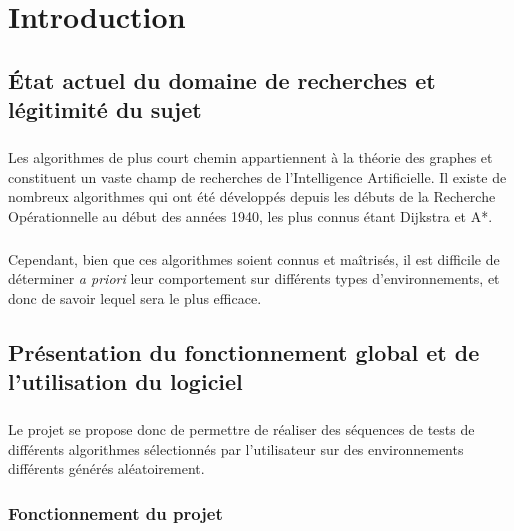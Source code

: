 \documentclass[pidr]{tnreport}
\begin{document}
\clearpage

\renewcommand{\baselinestretch}{0.5}\normalsize
\tableofcontents
\renewcommand{\baselinestretch}{1.0}\normalsize
\clearpage

\setcounter{page}{1}

\chapter{Introduction}

	\section{État actuel du domaine de recherches et légitimité du sujet}

\paragraph{}
Les algorithmes de plus court chemin appartiennent à la théorie des graphes et constituent un vaste champ de recherches de l'Intelligence Artificielle. Il existe de nombreux algorithmes qui ont été développés depuis les débuts de la Recherche Opérationnelle au début des années 1940, les plus connus étant Dijkstra et A*.

\paragraph{}
Cependant, bien que ces algorithmes soient connus et maîtrisés, il est difficile de déterminer \textit{a priori} leur comportement sur différents types d'environnements, et donc de savoir lequel sera le plus efficace. \linebreak

	\section{Présentation du fonctionnement global et de l'utilisation du logiciel}

\paragraph{}
Le projet se propose donc de permettre de réaliser des séquences de tests de différents algorithmes sélectionnés par l'utilisateur sur des environnements différents générés aléatoirement.

		\subsection{Fonctionnement du projet}
		
\end{document}

